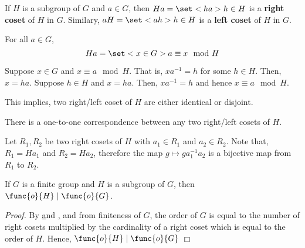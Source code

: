 \begin{definition}
    If \(H\) is a subgroup of \(G\) and \(a \in G\), then \(Ha = \set<ha>{h \in H}\) is a \textbf{right coset} of \(H\) in \(G\). Similary, \(aH = \set<ah>{h \in H}\) is a \textbf{left coset} of \(H\) in \(G\).
\end{definition}

\begin{lemma}\label{lm:cosetsAreEquivalenceClasses}
    For all \(a \in G\), 
    \begin{equation*}
        Ha = \set<x \in G>{a \equiv x \mod{H}}
    \end{equation*}
\end{lemma}

\begin{prooflemma}
    Suppose \(x \in G\) and \(x \equiv a \mod{H}\). That is, \(xa^{-1} = h\) for some \(h \in H\). Then, \(x = ha\). Suppose \(h \in H\) and \(x = ha\). Then, \(xa^{-1} = h\) and hence \(x \equiv a \mod{H}\).
\end{prooflemma}

This implies, two right/left coset of \(H\) are either identical or disjoint.

\begin{lemma}\label{lm:cosetsHaveSameCardinality}
    There is a one-to-one correspondence between any two right/left cosets of \(H\).
\end{lemma}

\begin{prooflemma}
    Let \(R_1,R_2\) be two right cosets of \(H\) with \(a_1 \in R_1\) and \(a_2 \in R_2\). Note that, \(R_1 = Ha_1\) and \(R_2 = Ha_2\), therefore the map \(g \mapsto ga_1^{-1} a_2\) is a bijective map from \(R_1\) to \(R_2\).
\end{prooflemma}

\begin{theorem}
    If \(G\) is a finite group and \(H\) is a subgroup of \(G\), then \(\func{o}{H} \mid \func{o}{G}\).
\end{theorem}

\begin{proof}
    By \href{lm:cosetsAreEquivalenceClasses} and \href{lm:cosetsHaveSameCardinality}, and from finiteness of \(G\), the order of \(G\) is equal to the number of right cosets multiplied by the cardinality of a right coset which is equal to the order of \(H\). Hence, \(\func{o}{H} \mid \func{o}{G}\)
\end{proof}

